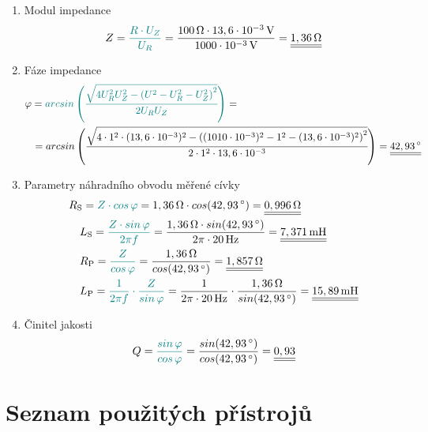 \documentclass[a4paper, czech]{article}
\begin{document}
\begin{enumerate}
    \item Modul impedance
    \begin{multline*}
        Z = \textcolor{teal}{\frac{R \cdot U_Z}{U_R}} = \frac{100\,\Omega \cdot 13,6 \cdot 10^{-3}\,\text{V}}{1000 \cdot 10^{-3}\,\text{V}} = \underline{\underline{1,36\,\Omega}} \hfill
    \end{multline*}
    \item Fáze impedance
    \begin{multline*}
        \varphi = \textcolor{teal}{arcsin \left(\cfrac{\sqrt{4 U^2_R U^2_Z - \left(U^2 - U^2_R - U^2_Z\right)^2}}{2 U_R U_Z}\right)} = \hfill \\
        \ \ \ = arcsin \left(\cfrac{\sqrt{4 \cdot 1^2 \cdot (13,6 \cdot 10^{-3})^2 - \left((1010 \cdot 10^{-3})^2 - 1^2 - (13,6 \cdot 10^{-3})^2\right)^2}}{2 \cdot 1^2 \cdot 13,6 \cdot 10^{-3}}\right) =
        \underline{\underline{42,93\,\degree}} \hfill
    \end{multline*}
    \item Parametry náhradního obvodu měřené cívky
    \begin{multline*}
        R_\text{S} = \textcolor{teal}{Z \cdot cos\,\varphi} = 1,36\,\Omega \cdot cos (42,93\,\degree) = \underline{\underline{0,996\,\Omega}} \hfill \\
        \ \ \ L_\text{S} = \textcolor{teal}{\frac{Z \cdot sin\,\varphi}{2 \pi f}} = \frac{1,36\,\Omega \cdot sin(42,93\,\degree)}{2 \pi \cdot 20\,\text{Hz}} = \underline{\underline{7,371\,\text{mH}}} \hfill \\
        \ \ \ R_\text{P} = \textcolor{teal}{\frac{Z}{cos\,\varphi}} = \frac{1,36\,\Omega}{cos (42,93\,\degree)} = \underline{\underline{1,857\,\Omega}} \hfill \\
        \ \ \ L_\text{P} = \textcolor{teal}{\frac{1}{2 \pi f} \cdot \frac{Z}{sin\,\varphi}} = \frac{1}{2 \pi \cdot 20\,\text{Hz}} \cdot \frac{1,36\,\Omega}{sin(42,93\,\degree)} = \underline{\underline{15,89\,\text{mH}}} \hfill
    \end{multline*}
    \item Činitel jakosti
    \begin{multline*}
        Q = \textcolor{teal}{\frac{sin\,\varphi}{cos\,\varphi}} = \frac{sin(42,93\,\degree)}{cos(42,93\,\degree)} = \underline{\underline{0,93}} \hfill
    \end{multline*}
\end{enumerate}

\section{Seznam použitých přístrojů}
\end{document}
